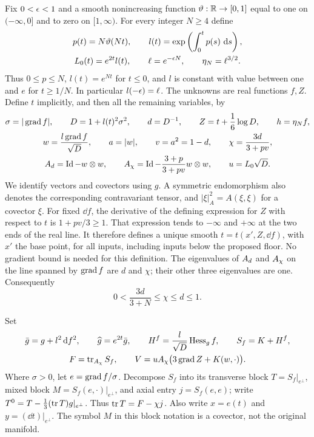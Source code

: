 Fix $0<\epsilon<1$ and a smooth nonincreasing function
$\vartheta:\mathbb R\to[0,1]$ equal to one on $(-\infty,0]$ and to zero on
$[1,\infty)$.  For every integer $N\ge4$ define
\begin{equation}\label{four:sys:parameters}
\begin{gathered}
 p(t)=N\vartheta(Nt),\qquad
 l(t)=\exp\left(\int_0^t p(s)\,\,\mathrm d s\right),\\
 L_0(t)=e^{2t}l(t),\qquad
 \ell=e^{-\epsilon N},\qquad \eta_N=\ell^{3/2}.
\end{gathered}
\end{equation}
Thus $0\le p\le N$, $l(t)=e^{Nt}$ for $t\le0$, and $l$ is constant
with value between one and $e$ for $t\ge1/N$.  In particular
$l(-\epsilon)=\ell$.  The unknowns are real functions $f,Z$.  Define $t$
implicitly, and then all the remaining variables, by
\begin{equation}\label{four:sys:variables}
\begin{gathered}
 \sigma=|\operatorname{grad} f|,\qquad
 D=1+l(t)^2\sigma^2,\qquad d=D^{-1},\qquad
 Z=t+\frac16\log D,\qquad h=\eta_N f,\\
 w=\frac{l\operatorname{grad} f}{\sqrt D},\qquad a=|w|,\qquad
 v=a^2=1-d,\qquad \chi=\frac{3d}{3+pv},\\
 A_d=\operatorname{Id}-w\otimes w,\qquad
 A_\chi=\operatorname{Id}-\frac{3+p}{3+pv}w\otimes w,\qquad
 u=L_0\sqrt D.
\end{gathered}
\end{equation}
We identify vectors and covectors using $g$.  A symmetric endomorphism
also denotes the corresponding contravariant tensor, and
$|\xi|_A^2=A(\xi,\xi)$ for a covector $\xi$.
For fixed $\dd f$, the derivative of the defining expression for $Z$
with respect to $t$ is $1+pv/3\ge1$.  That expression tends to
$-\infty$ and $+\infty$ at the two ends of the real line.  It therefore
defines a unique smooth $t=t(x',Z,\dd f)$, with $x'$ the base point, for all inputs, including inputs
below the proposed floor.  No gradient bound is needed for this definition.
The eigenvalues of $A_d$ and $A_\chi$ on the line spanned by $\operatorname{grad} f$
are $d$ and $\chi$; their other three eigenvalues are one.  Consequently
\begin{equation}\label{four:sys:eigenvalues}
 0<\frac{3d}{3+N}\le\chi\le d\le1.
\end{equation}

Set
\begin{equation}\label{four:sys:metric-and-trace}
\begin{gathered}
 \bar g=g+l^2\,\mathrm d f^2,\qquad \widehat g=e^{2t}\bar g,\qquad
 H^f=\frac{l}{\sqrt D}\operatorname{Hess}_g f,\qquad S_f=K+H^f,\\
 F=\operatorname{tr}_{A_\chi}S_f,\qquad
 V=uA_\chi\bigl(3\operatorname{grad} Z+K(w,\cdot)\bigr).
\end{gathered}
\end{equation}
Where $\sigma>0$, let $e=\operatorname{grad} f/\sigma$.  Decompose $S_f$ into its
transverse block $T=S_f|_{e^\perp}$, mixed block
$M=S_f(e,\cdot)|_{e^\perp}$, and axial entry $j=S_f(e,e)$; write
$T^0=T-\frac13(\operatorname{tr} T)g|_{e^\perp}$.  Thus $\operatorname{tr} T=F-\chi j$.
Also write $x=e(t)$ and $y=(\dd t)|_{e^\perp}$.  The symbol $M$ in this
block notation is a covector, not the original manifold.

